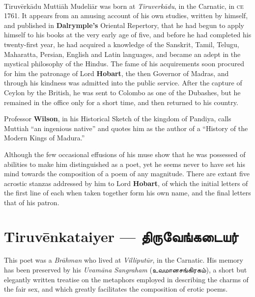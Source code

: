 \documentclass{article}
\newcommand{\TamilText}[1]{\texttamil{#1}}
\newcommand{\TamilBold}[1]{\texttamil{\textbf{#1}}}
\newcommand{\tam}[1]{\TamilText{#1}}
\newcommand{\tambold}[1]{\TamilBold{#1}}
\begin{document}
\paragraph{}
Tiruv\={e}rk\={a}du Mutti\={a}h Mudeli\={a}r was born at \emph{Tiruverk\={a}du}, in the Carnatic, in \textsc{ce} 1761. It appears from an amusing account of his own studies, written by himself, and published in \textbf{Dalrymple's} Oriental Repertory, that he had begun to apply himself to his books at the very early age of five, and before he had completed his twenty-first year, he had acquired a knowledge of the Sanskrit, Tamil, Telugu, Maharatta, Persian, English and Latin languages, and became an adept in the mystical philosophy of the Hindus. The fame of his acquirements soon procured for him the patronage of Lord \textbf{Hobart}, the then Governor of Madras, and through his kindness was admitted into the public service. After the capture of Ceylon by the British, he was sent to Colombo as one of the Dubashes, but he remained in the office only for a short time, and then returned to his country.

Professor \textbf{Wilson}, in his Historical Sketch of the kingdom of Pandiya, calls Muttiah ``an ingenious native'' and quotes him as the author of a ``History of the Modern Kings of Madura.''

Although the few occasional effusions of his muse show that he was possessed of abilities to make him distinguished as a poet, yet he seems never to have set his mind towards the composition of a poem of any magnitude. There are extant five acrostic stanzas addressed by him to Lord \textbf{Hobart}, of which the initial letters of the first line of each when taken together form his own name, and the final letters that of his patron.

\section{Tiruv\={e}nkataiyer --- \tambold{திருவேங்கடையர்}}
\paragraph{}
This poet was a \emph{Br\={a}hman} who lived at \emph{Villiput\={u}r}, in the Carnatic. His memory has been preserved by his \emph{Uvam\={a}na Sangraham} (\tam{உவமானசங்கிரகம்}), a short but elegantly written treatise on the metaphors employed in describing the charms of the fair sex, and which greatly facilitates the composition of erotic poems.
\end{document}
